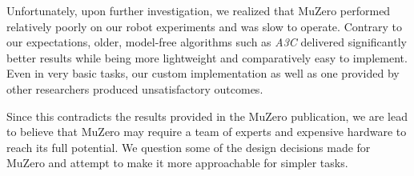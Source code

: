 Unfortunately, upon further investigation, we realized that MuZero performed relatively poorly on our robot experiments and was slow to operate. Contrary to our expectations, older, model-free algorithms such as \textit{A3C} \cite{a3c} delivered significantly better results while being more lightweight and comparatively easy to implement. Even in very basic tasks, our custom implementation as well as one provided by other researchers produced unsatisfactory outcomes.

Since this contradicts the results provided in the MuZero publication, we are lead to believe that MuZero may require a team of experts and expensive hardware to reach its full potential. We question some of the design decisions made for MuZero and attempt to make it more approachable for simpler tasks.